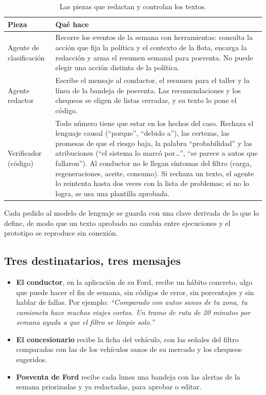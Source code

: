 \begin{table}[!htbp]
\centering
\caption{Las piezas que redactan y controlan los textos.}
\label{tab:agentes}
\small
\begin{tabularx}{\textwidth}{@{}>{\raggedright\arraybackslash}p{3.4cm}>{\raggedright\arraybackslash}X@{}}
\toprule
Pieza & Qué hace \\
\midrule
Agente de clasificación & Recorre los eventos de la semana con herramientas: consulta la acción que fija la política y el
  contexto de la flota, encarga la redacción y arma el resumen semanal para posventa. No puede elegir una acción distinta de
  la política. \\
Agente redactor & Escribe el mensaje al conductor, el resumen para el taller y la línea de la bandeja de posventa. Las
  recomendaciones y los chequeos se eligen de listas cerradas, y su texto lo pone el código. \\
Verificador (código) & Todo número tiene que estar en los hechos del caso. Rechaza el lenguaje causal (``porque'',
  ``debido a''), las certezas, las promesas de que el riesgo baja, la palabra ``probabilidad'' y las atribuciones (``el
  sistema lo marcó por\ldots'', ``se parece a autos que fallaron''). Al conductor no le llegan síntomas del filtro (carga,
  regeneraciones, aceite, consumo). Si rechaza un texto, el agente lo reintenta hasta dos veces con la lista de problemas;
  si no lo logra, se usa una plantilla aprobada. \\
\bottomrule
\end{tabularx}
\end{table}

Cada pedido al modelo de lenguaje se guarda con una clave derivada de lo que lo define, de modo que un texto aprobado no
cambia entre ejecuciones y el prototipo se reproduce sin conexión.

\subsection{Tres destinatarios, tres mensajes}

\begin{itemize}
  \item \textbf{El conductor}, en la aplicación de su Ford, recibe un hábito concreto, algo que puede hacer el fin de semana,
    sin códigos de error, sin porcentajes y sin hablar de fallas. Por ejemplo: \emph{``Comparado con autos sanos de tu zona,
    tu camioneta hace muchos viajes cortos. Un tramo de ruta de 20 minutos por semana ayuda a que el filtro se limpie
    solo.''}
  \item \textbf{El concesionario} recibe la ficha del vehículo, con las señales del filtro comparadas con las de los
    vehículos sanos de su mercado y los chequeos sugeridos.
  \item \textbf{Posventa de Ford} recibe cada lunes una bandeja con las alertas de la semana priorizadas y ya redactadas,
    para aprobar o editar.
\end{itemize}

